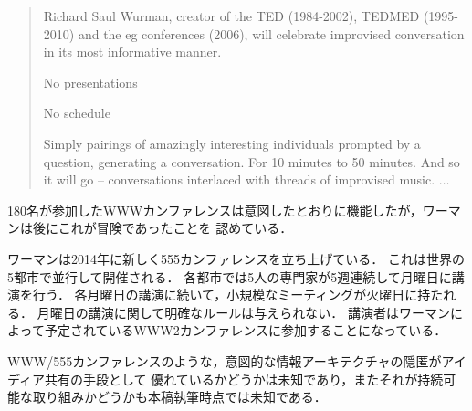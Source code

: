 \documentclass[submit,techreq,jkeyword,noauthor]{ipsj}
\begin{document}
\begin{quote}
Richard Saul Wurman, creator of the TED (1984-2002), TEDMED (1995-2010) and the eg 
conferences (2006), will celebrate improvised conversation in its most informative manner.

No presentations

No schedule

Simply pairings of amazingly interesting individuals prompted by a question, generating a 
conversation. For 10 minutes to 50 minutes. And so it will go – conversations interlaced 
with threads of improvised music. 
% 
% 
% 
% 
% 
% 
$\dots$
\end{quote}

180名が参加したWWWカンファレンスは意図したとおりに機能したが，ワーマンは後にこれが冒険であったことを
認めている．\cite{ek}



ワーマンは2014年に新しく555カンファレンスを立ち上げている．
これは世界の5都市で並行して開催される．
各都市では5人の専門家が5週連続して月曜日に講演を行う．
各月曜日の講演に続いて，小規模なミーティングが火曜日に持たれる．
月曜日の講演に関して明確なルールは与えられない．
講演者はワーマンによって予定されているWWW2カンファレンスに参加することになっている．\cite{ek}

WWW/555カンファレンスのような，意図的な情報アーキテクチャの隠匿がアイディア共有の手段として
優れているかどうかは未知であり，またそれが持続可能な取り組みかどうかも本稿執筆時点では未知である．
\end{document}
